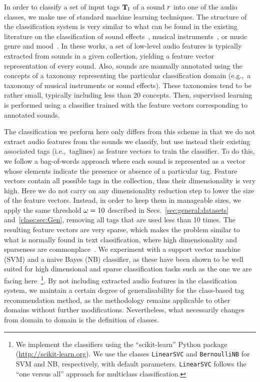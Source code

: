 In order to classify a set of input tags $\mathbf{T}_{\text{I}}$ of a sound $r$ into one of the audio classes, we make use of standard machine learning techniques. The structure of the classification system is very similar to what can be found in the existing literature on the classification of sound effects~\citep{Kuo1999,Casey2002,Sundaram2008,Roma2010}, musical instruments~\citep{Herrera2003,Livshin2003,Cano2004}, or music genre and mood~\citep{laurier2008,Bischoff2009,Chen2009,Tao2010}.
In these works, a set of low-level audio features is typically extracted from sounds in a given collection, yielding a feature vector representation of every sound. Also, sounds are manually annotated using the concepts of a taxonomy representing the particular classification domain (e.g.,~a taxonomy of musical instruments or sound effects). These taxonomies tend to be rather small, typically including less than 20 concepts. Then, supervised learning is performed using a classifier trained with the feature vectors corresponding to annotated sounds. 

The classification we perform here only differs from this scheme in that we do not extract audio features from the sounds we classify, but use instead their existing associated tags (i.e.,~taglines) as feature vectors to train the classifier.
To do this, we follow a bag-of-words approach where each sound is represented as a vector whose elements indicate the presence or absence of a particular tag. 
Feature vectors contain all possible tags in the collection, thus their dimensionality is very high. 
Here we do not carry on any dimensionality reduction step to lower the size of the feature vectors. Instead, in order to keep them in manageable sizes, we apply the same threshold $\omega=10$ described in Secs.~\ref{sec:general:datasets} and~\ref{class:sec:Gen}, removing all tags that are used less than 10 times.
The resulting feature vectors are very sparse, which makes the problem similar to what is normally found in text classification, where high dimensionality and sparseness are commonplace~\citep{Sebastiani2002}.
We experiment with a support vector machine (SVM) and a naive Bayes (NB) classifier, as these have been shown to be well suited for high dimensional and sparse classification tasks such as the one we are facing here~\citep{Bennett2000,Sebastiani2002}\footnote{We implement the classifiers using the  ``scikit-learn'' Python package (\url{http://scikit-learn.org}). We use the classes \texttt{LinearSVC} and \texttt{BernoulliNB} for SVM and NB, respectively, with default parameters. \texttt{LinearSVC} follows the ``one versus all'' approach for multiclass classification.}.
By not including extracted audio features in the classification system, we maintain a certain degree of generalisability for the class-based tag recommendation method, as the methodology remains applicable to other domains without further modifications. Nevertheless, what necessarily changes from domain to domain is the definition of classes.

